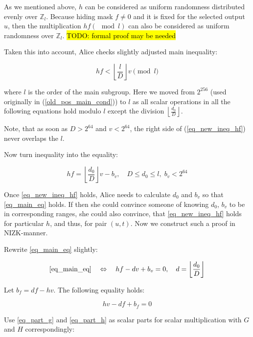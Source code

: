 \documentclass{article}
\newcommand{\floor}[1]{\left\lfloor #1 \right\rfloor}
\numberwithin{figure}{section}
\begin{document}
As we mentioned above, $h$ can be considered as uniform randomness distributed evenly over $\mathbb{Z}_l$. Because hiding mask $f \neq 0$ and it is fixed for the selected output $u$, then the multiplication $hf (\mod{l})$ can also be considered as uniform randomness over $\mathbb{Z}_l$. \hl{TODO: formal proof may be needed}

Taken this into account, Alice checks slightly adjusted main inequality:

\begin{equation} \label{eq_new_ineq_hf}
    hf < \floor{\frac{l}{D}}v \pmod l
\end{equation}

where $l$ is the order of the main subgroup. Here we moved from $2^{256}$ (used originally in (\ref{old_pos_main_cond})) to $l$ as all scalar operations in all the following equations hold modulo $l$ except the division $\floor{\frac{d_0}{D}}$.

Note, that as soon as $D > 2^{64}$ and $v < 2^{64}$, the right side of (\ref{eq_new_ineq_hf}) never overlaps the $l$.

Now turn inequality into the equality:

\begin{equation} \label{eq_main_eq}
    hf = \floor{\frac{d_0}{D}} v - b_v, \quad D \leq d_0 \leq l, \; b_v < 2^{64}
\end{equation}

Once \eqref{eq_new_ineq_hf} holds, Alice needs to calculate $d_0$ and $b_v$ so that \eqref{eq_main_eq} holds. If then she could convince someone of knowing $d_0$, $b_v$ to be in corresponding ranges, she could also convince, that \eqref{eq_new_ineq_hf} holds for particular $h$, and thus, for pair $(u, t)$. Now we construct such a proof in NIZK-manner.

Rewrite \eqref{eq_main_eq} slightly:

\begin{equation} \label{eq_part_g}
    \eqref{eq_main_eq} \quad \Leftrightarrow \quad hf - dv + b_v = 0, \quad d = \floor{\frac{d_0}{D}}
\end{equation}

Let $b_f = df - hv$. The following equality holds:

\begin{equation} \label{eq_part_h}
    hv - df + b_f = 0
\end{equation}

Use \eqref{eq_part_g} and \eqref{eq_part_h} as scalar parts for scalar multiplication with $G$ and $H$ correspondingly:
\end{document}
